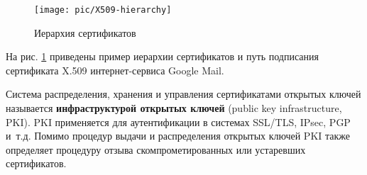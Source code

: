 \begin{figure}[h!]
	\centering
	\texttt{[image: pic/X509-hierarchy]}
	\caption{Иерархия сертификатов\label{fig:x509-hierarchy}}
\end{figure}

На рис. \ref{fig:x509-hierarchy} приведены пример иерархии сертификатов и путь подписания сертификата X.509 интернет-сервиса Google Mail.

Система распределения, хранения и управления сертификатами открытых ключей называется \textbf{инфраструктурой открытых ключей} (public key infrastructure, PKI). PKI применяется для аутентификации в системах SSL/TLS, IPsec, PGP и~т.д. Помимо процедур выдачи и распределения открытых ключей PKI также определяет процедуру отзыва скомпрометированных или устаревших сертификатов.
